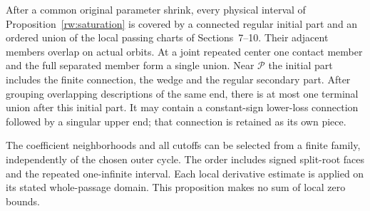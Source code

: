 \begin{proposition}
\label{rw:ordered-cover}
After a common original parameter shrink, every physical interval
of Proposition~\ref{rw:saturation} is covered by a connected
regular initial part and an ordered union of the local passing
charts of Sections~7--10. Their adjacent members overlap on
actual orbits. At a joint repeated center one contact member and
the full separated member form a single union. Near $\mathcal P$
the initial part includes the finite connection, the wedge and
the regular secondary part.
After grouping overlapping descriptions of the same end, there
is at most one terminal union after this initial part.
It may contain a constant-sign lower-loss connection followed
by a singular upper end; that connection is retained as its
own piece.

The coefficient neighborhoods and all cutoffs can be selected
from a finite family, independently of the chosen outer cycle.
The order includes signed split-root faces and the repeated
one-infinite interval. Each local derivative estimate is applied
on its stated whole-passage domain. This proposition makes no
sum of local zero bounds.
\end{proposition}
